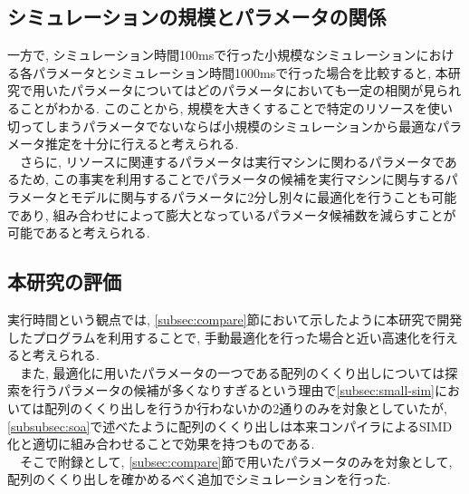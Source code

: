 \subsection{シミュレーションの規模とパラメータの関係}
一方で, シミュレーション時間100msで行った小規模なシミュレーションにおける各パラメータとシミュレーション時間1000msで行った場合を比較すると,
本研究で用いたパラメータについてはどのパラメータにおいても一定の相関が見られることがわかる.
このことから, 規模を大きくすることで特定のリソースを使い切ってしまうパラメータでないならば小規模のシミュレーションから最適なパラメータ推定を十分に行えると考えられる.\\
　さらに, リソースに関連するパラメータは実行マシンに関わるパラメータであるため,
この事実を利用することでパラメータの候補を実行マシンに関与するパラメータとモデルに関与するパラメータに2分し別々に最適化を行うことも可能であり,
組み合わせによって膨大となっているパラメータ候補数を減らすことが可能であると考えられる.\\

\subsection{本研究の評価}
実行時間という観点では, \ref{subsec:compare}節において示したように本研究で開発したプログラムを利用することで,
手動最適化を行った場合と近い高速化を行えると考えられる.\\
　また, 最適化に用いたパラメータの一つである配列のくくり出しについては探索を行うパラメータの候補が多くなりすぎるという理由で\ref{subsec:small-sim}においては配列のくくり出しを行うか行わないかの2通りのみを対象としていたが,
\ref{subsubsec:soa}で述べたように配列のくくり出しは本来コンパイラによるSIMD化と適切に組み合わせることで効果を持つものである.\\
　そこで附録として, \ref{subsec:compare}節で用いたパラメータのみを対象として, 配列のくくり出しを確かめるべく追加でシミュレーションを行った.\\
